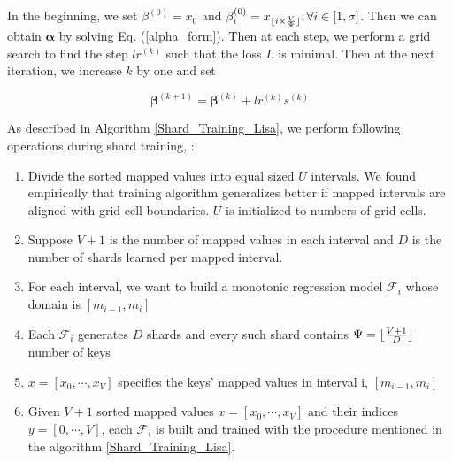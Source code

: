 In the beginning, we set $\beta^{(0)}=x_0$ and $\beta_i^{(0)}=x_{\lfloor i\times \frac{V}{\Psi}\rfloor}, \forall i\in[1,\sigma]$. Then we can obtain $\boldsymbol{\alpha}$ by solving Eq. (\ref{alpha_form}). Then at each step, we perform a grid search to find the step $lr^{(k)}$ such that the loss $L$ is minimal. Then at the next iteration, we increase $k$ by one and set 

$$
\boldsymbol{\beta}^{(k+1)}=\boldsymbol{\beta}^{(k)} + lr^{(k)}s^{(k)}
$$

As described in Algorithm \ref{Shard_Training_Lisa}, we perform  following operations during shard training, :

\begin{enumerate}
	\item Divide the sorted mapped values into equal sized $U$ intervals. We found empirically that training algorithm generalizes better if mapped intervals are aligned with grid cell boundaries. $U$ is initialized to numbers of grid cells. 
	\item Suppose $V +1$ is the number of mapped values in each interval and $D$ is the  number of shards learned per mapped interval.
	\item For each interval, we want to build a monotonic regression
    model $ \mathcal {F}_{i}$ whose domain is $[m_{i-1},m_{i}]$ 
 
 	\item Each $\mathcal{F}_{i}$ generates $D$ shards and every such shard contains $\Psi = \lfloor\frac{V+1}{D}\rfloor$ number of keys 
    
    \item $x =[x_0,\cdots, x_V] $ specifies the keys' mapped values in interval i, $[m_{i-1},m_{i}]$ 
    
    \item Given $V +1$ sorted mapped values $x =[x_0,\cdots, x_V]$ and their indices $y =[0,\cdots, V]$, each $\mathcal{F}_{i}$ is built and trained with the procedure mentioned in the algorithm \ref{Shard_Training_Lisa}.
    

\end{enumerate}

